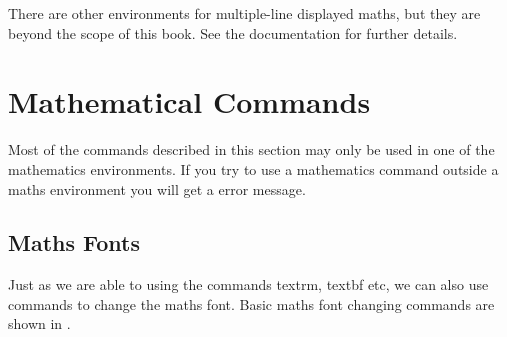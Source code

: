 There are other environments for multiple-line displayed maths, but
they are beyond the scope of this book. See
the  documentation for further details.


\section{Mathematical Commands}
\label{sec:mathscom}

Most of the \glspl{command} described in this
section may only be used in one of the mathematics environments.  If
you try to use a mathematics command outside a maths environment you
will get a  error message.


\subsection{Maths Fonts}
\label{sec:mathsfonts}

Just as we are able to  using
the commands \gls{textrm}, \gls{textbf} etc, we can also
use commands to change the maths font.  Basic maths font changing
commands are shown in .

